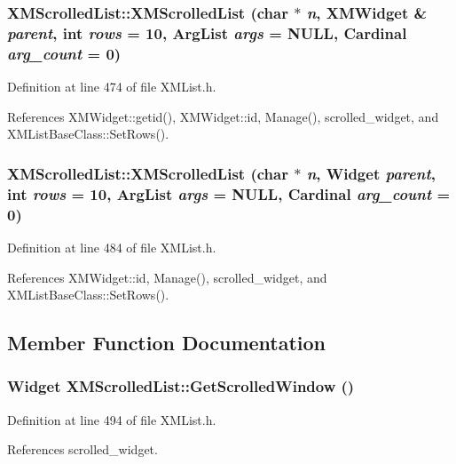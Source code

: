 \subsubsection{\setlength{\rightskip}{0pt plus 5cm}XMScrolled\-List::XMScrolled\-List (char $\ast$ {\em n}, {\bf XMWidget} \& {\em parent}, int {\em rows} = 10, Arg\-List {\em args} = NULL, Cardinal {\em arg\_\-count} = 0)\hspace{0.3cm}{\tt  [inline]}}\label{classXMScrolledList_a0}




Definition at line 474 of file XMList.h.

References XMWidget::getid(), XMWidget::id, Manage(), scrolled\_\-widget, and XMList\-Base\-Class::Set\-Rows().
\subsubsection{\setlength{\rightskip}{0pt plus 5cm}XMScrolled\-List::XMScrolled\-List (char $\ast$ {\em n}, Widget {\em parent}, int {\em rows} = 10, Arg\-List {\em args} = NULL, Cardinal {\em arg\_\-count} = 0)\hspace{0.3cm}{\tt  [inline]}}\label{classXMScrolledList_a1}




Definition at line 484 of file XMList.h.

References XMWidget::id, Manage(), scrolled\_\-widget, and XMList\-Base\-Class::Set\-Rows().

\subsection{Member Function Documentation}
\subsubsection{\setlength{\rightskip}{0pt plus 5cm}Widget XMScrolled\-List::Get\-Scrolled\-Window ()\hspace{0.3cm}{\tt  [inline]}}\label{classXMScrolledList_a2}




Definition at line 494 of file XMList.h.

References scrolled\_\-widget.

